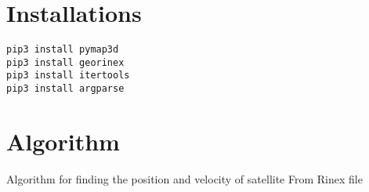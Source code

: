 \section{Installations}

\begin{lstlisting}
pip3 install pymap3d
pip3 install georinex
pip3 install itertools
pip3 install argparse
\end{lstlisting}

\section{Algorithm}
Algorithm for finding the position and velocity of satellite From Rinex file
